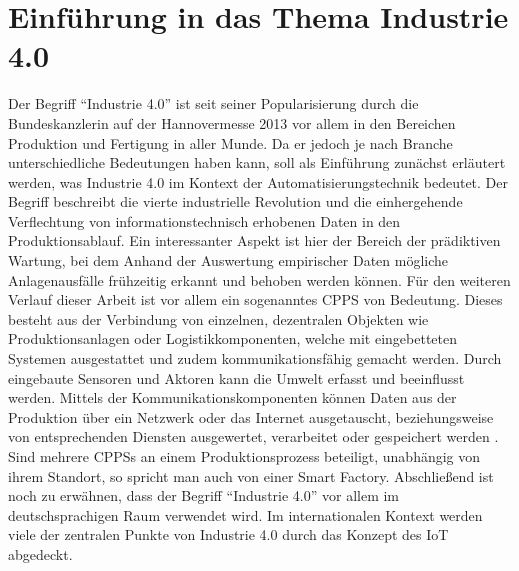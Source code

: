 \chapter{Einführung in das Thema Industrie 4.0}

Der Begriff "`Industrie 4.0"' ist seit seiner Popularisierung durch die Bundeskanzlerin auf der Hannovermesse 2013 vor allem in den Bereichen Produktion und Fertigung in aller Munde. Da er jedoch je nach Branche unterschiedliche Bedeutungen haben kann, soll als Einführung zunächst erläutert werden, was Industrie 4.0 im Kontext der Automatisierungstechnik bedeutet.
Der Begriff beschreibt die vierte industrielle Revolution und die einhergehende Verflechtung von informationstechnisch erhobenen Daten in den Produktionsablauf. Ein interessanter Aspekt ist hier der Bereich der prädiktiven Wartung, bei dem Anhand der Auswertung empirischer Daten mögliche Anlagenausfälle frühzeitig erkannt und behoben werden können.
Für den weiteren Verlauf dieser Arbeit ist vor allem ein sogenanntes \ac{CPPS} von Bedeutung. Dieses besteht aus der Verbindung von einzelnen, dezentralen Objekten wie Produktionsanlagen oder Logistikkomponenten, welche mit eingebetteten Systemen ausgestattet und zudem kommunikationsfähig gemacht werden. Durch eingebaute Sensoren und Aktoren kann die Umwelt erfasst und beeinflusst werden. Mittels der Kommunikationskomponenten können Daten aus der Produktion über ein Netzwerk oder das Internet ausgetauscht, beziehungsweise von entsprechenden Diensten ausgewertet, verarbeitet oder gespeichert werden
\cite{Bauerhansl2014}.\\[4pt]
Sind mehrere \aclp{CPPS} an einem Produktionsprozess beteiligt, unabhängig von ihrem Standort, so spricht man auch von einer Smart Factory.
Abschließend ist noch zu erwähnen, dass der Begriff "`Industrie 4.0"' vor allem im deutschsprachigen Raum verwendet wird. Im internationalen Kontext werden viele der zentralen Punkte von Industrie 4.0 durch das Konzept des \ac{IoT} abgedeckt.
\clearpage




